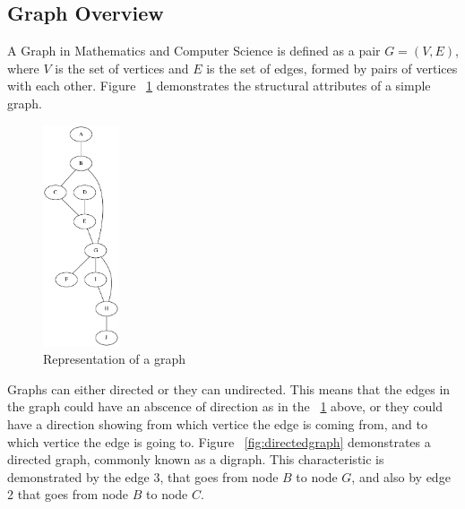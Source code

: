 \label{Graph Basics}

\subsection{Graph Overview}
A Graph in Mathematics and Computer Science is defined as a pair $G = (V, E)$,  where $V$ is the set of vertices and $E$ is the set of edges, formed by pairs of vertices with each other. Figure ~\ref{fig:simplegraph} demonstrates the structural 
attributes of a simple graph.

\begin{figure}[H]
  \begin{center}
      \includegraphics[width=0.2\textwidth]{simplegraph.png}
  \end{center}    
  \caption{Representation of a graph}
  \label{fig:simplegraph}
\end{figure} 

Graphs can either directed or they can undirected. This means that the edges in the graph could have an abscence of direction as in the ~\ref{fig:simplegraph} above, or they could have a direction showing from which
vertice the edge is coming from, and to which vertice the edge is going to. Figure ~\ref{fig:directedgraph} demonstrates a directed graph, commonly known as a digraph. This characteristic is demonstrated by the edge $3$, 
that goes from node $B$ to node $G$, and also by edge 2 that goes from node $B$ to node $C$. 

